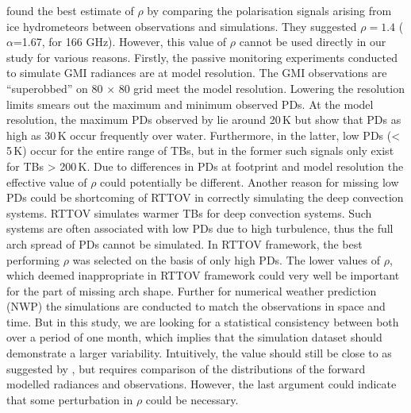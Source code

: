 \documentclass[amt, manuscript]{copernicus}
\begin{document}
\citet{barlakas:intro:21} found the best estimate of $\rho$ by comparing the polarisation signals arising from ice hydrometeors between observations and simulations. They suggested $\rho = 1.4$ ($\alpha$=1.67, for 166\,\,GHz). However, this value of $\rho$ cannot be used directly in our study for various reasons. Firstly, the passive monitoring experiments conducted to simulate GMI radiances are at model resolution. The GMI observations are ``superobbed'' on 80 $\times$ 80 grid meet the model resolution. Lowering the resolution limits smears out the maximum and minimum observed PDs. At the model resolution, the maximum PDs observed by \citet{barlakas:intro:21} lie around 20\,K but \citet{gong:micro:17} show that PDs as high as 30\,K occur frequently over water. Furthermore, in the latter, low PDs (< 5\,K) occur for the entire range of TBs, but in the former such signals only exist for TBs > 200\,K. Due to differences in PDs at footprint and model resolution the effective value of $\rho$ could potentially be different. Another reason for missing low PDs could be shortcoming of RTTOV in correctly simulating the deep convection systems. RTTOV simulates warmer TBs for deep convection systems. Such systems are often associated with low PDs due to high turbulence, thus the full arch spread of PDs cannot be simulated. In RTTOV framework, the best performing $\rho$ was selected on the basis of only high PDs. The lower values of $\rho$, which deemed inappropriate in RTTOV framework could very well be important for the part of missing arch shape. Further for numerical weather prediction (NWP) the simulations are conducted to match the observations in space and time. But in this study, we are looking for a statistical consistency between both over a period of one month, which implies that the simulation dataset should demonstrate a larger variability.  Intuitively, the value should still be close to as suggested by \citet{barlakas:intro:21}, but requires comparison of the distributions of the forward modelled radiances and observations. However, the last argument could  indicate that some perturbation in $\rho$ could be necessary.
\end{document}
